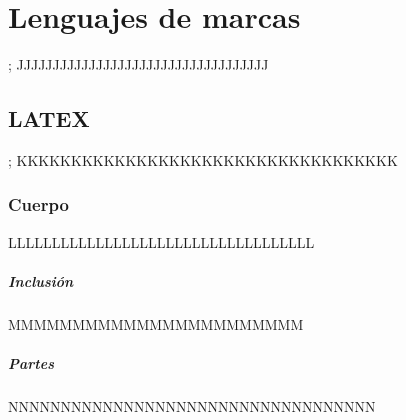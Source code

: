 \chapter{Lenguajes de marcas};
JJJJJJJJJJJJJJJJJJJJJJJJJJJJJJJJJJJ
	\section{LATEX};
	KKKKKKKKKKKKKKKKKKKKKKKKKKKKKKKKKKK
		\subsection{Cuerpo}
		LLLLLLLLLLLLLLLLLLLLLLLLLLLLLLLLLLL
	\paragraph{Inclusión}
	MMMMMMMMMMMMMMMMMMMMMMM
	\paragraph{Partes}
	NNNNNNNNNNNNNNNNNNNNNNNNNNNNNNNNNNN

